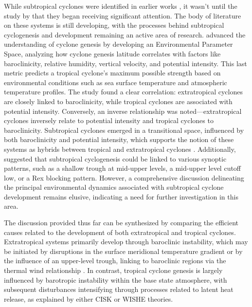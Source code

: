 While subtropical cyclones were identified in earlier works \citep{simpson1952evolution}, it wasn't until the study by \citet{hart2003cyclone} that they began receiving significant attention. The body of literature on these systems is still developing, with the processes behind subtropical cyclogenesis and development remaining an active area of research. \citet{yanase2014parameter} advanced the understanding of cyclone genesis by developing an Environmental Parameter Space, analyzing how cyclone genesis latitude correlates with factors like baroclinicity, relative humidity, vertical velocity, and potential intensity. This last metric predicts a tropical cyclone's maximum possible strength based on environmental conditions such as sea surface temperature and atmospheric temperature profiles. The study found a clear correlation: extratropical cyclones are closely linked to baroclinicity, while tropical cyclones are associated with potential intensity. Conversely, an inverse relationship was noted—extratropical cyclones inversely relate to potential intensity and tropical cyclones to baroclinicity. Subtropical cyclones emerged in a transitional space, influenced by both baroclinicity and potential intensity, which supports the notion of these systems as hybrids between tropical and extratropical cyclones \citep[e.g]{hart2003cyclone}. Additionally, \citet{da2019subtropical} suggested that subtropical cyclogenesis could be linked to various synoptic patterns, such as a shallow trough at mid-upper levels, a mid-upper level cutoff low, or a Rex blocking pattern. However, a comprehensive discussion delineating the principal environmental dynamics associated with subtropical cyclone development remains elusive, indicating a need for further investigation in this area.

The discussion provided thus far can be synthesized by comparing the efficient causes related to the development of both extratropical and tropical cyclones. Extratropical systems primarily develop through baroclinic instability, which may be initiated by disruptions in the surface meridional temperature gradient or by the influence of an upper-level trough, linking to baroclinic regions via the thermal wind relationship \citep{holton1973introduction,spiridonov2021fundamentals}. In contrast, tropical cyclone genesis is largely influenced by barotropic instability within the base state atmosphere, with subsequent disturbances intensifying through processes related to latent heat release, as explained by either CISK or WISHE theories.

